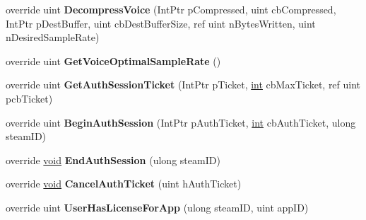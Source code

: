 \begin{DoxyCompactItemize}
\item 
\hypertarget{classValve_1_1Steamworks_1_1CSteamUser_ac7468e07cdbd3ddb4965e296023a3164}{}override uint {\bfseries Decompress\+Voice} (Int\+Ptr p\+Compressed, uint cb\+Compressed, Int\+Ptr p\+Dest\+Buffer, uint cb\+Dest\+Buffer\+Size, ref uint n\+Bytes\+Written, uint n\+Desired\+Sample\+Rate)\label{classValve_1_1Steamworks_1_1CSteamUser_ac7468e07cdbd3ddb4965e296023a3164}

\item 
\hypertarget{classValve_1_1Steamworks_1_1CSteamUser_a94685c26852ffaf27f904b5ee918d7ee}{}override uint {\bfseries Get\+Voice\+Optimal\+Sample\+Rate} ()\label{classValve_1_1Steamworks_1_1CSteamUser_a94685c26852ffaf27f904b5ee918d7ee}

\item 
\hypertarget{classValve_1_1Steamworks_1_1CSteamUser_a67bb601b9c856e3cb1bd28a803b18857}{}override uint {\bfseries Get\+Auth\+Session\+Ticket} (Int\+Ptr p\+Ticket, \hyperlink{SDL__thread_8h_a6a64f9be4433e4de6e2f2f548cf3c08e}{int} cb\+Max\+Ticket, ref uint pcb\+Ticket)\label{classValve_1_1Steamworks_1_1CSteamUser_a67bb601b9c856e3cb1bd28a803b18857}

\item 
\hypertarget{classValve_1_1Steamworks_1_1CSteamUser_ab79fc2c8f0496ba038f05652bc36f5ec}{}override uint {\bfseries Begin\+Auth\+Session} (Int\+Ptr p\+Auth\+Ticket, \hyperlink{SDL__thread_8h_a6a64f9be4433e4de6e2f2f548cf3c08e}{int} cb\+Auth\+Ticket, ulong steam\+I\+D)\label{classValve_1_1Steamworks_1_1CSteamUser_ab79fc2c8f0496ba038f05652bc36f5ec}

\item 
\hypertarget{classValve_1_1Steamworks_1_1CSteamUser_adbccafcdfbfe71e0a9616017bd77cd34}{}override \hyperlink{SDL__audio_8h_a52835ae37c4bb905b903cbaf5d04b05f}{void} {\bfseries End\+Auth\+Session} (ulong steam\+I\+D)\label{classValve_1_1Steamworks_1_1CSteamUser_adbccafcdfbfe71e0a9616017bd77cd34}

\item 
\hypertarget{classValve_1_1Steamworks_1_1CSteamUser_af90f369761d824ba1fb909dbd2508bd6}{}override \hyperlink{SDL__audio_8h_a52835ae37c4bb905b903cbaf5d04b05f}{void} {\bfseries Cancel\+Auth\+Ticket} (uint h\+Auth\+Ticket)\label{classValve_1_1Steamworks_1_1CSteamUser_af90f369761d824ba1fb909dbd2508bd6}

\item 
\hypertarget{classValve_1_1Steamworks_1_1CSteamUser_a4c1e0ad2d6a66c66381a446677748a86}{}override uint {\bfseries User\+Has\+License\+For\+App} (ulong steam\+I\+D, uint app\+I\+D)\label{classValve_1_1Steamworks_1_1CSteamUser_a4c1e0ad2d6a66c66381a446677748a86}


\end{DoxyCompactItemize}

